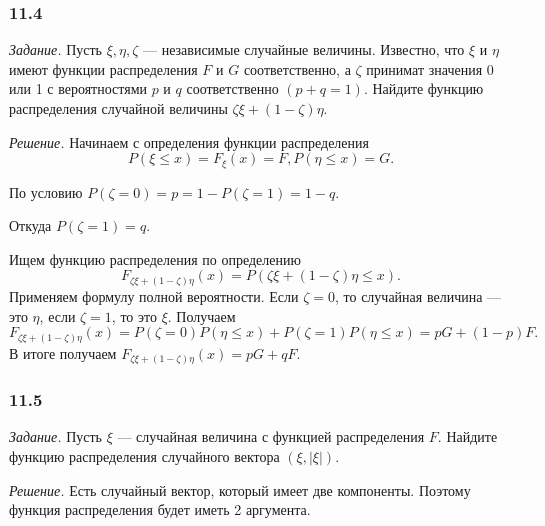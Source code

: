 \subsubsection*{11.4}

\textit{Задание.} Пусть $ \xi, \eta, \zeta $ --- независимые случайные величины.
Известно,
что $ \xi $ и $ \eta $ имеют функции распределения $F$ и $G$ соответственно,
а $ \zeta $ принимат значения 0 или 1 с вероятностями $p$ и $q$ соответственно $ \left( p + q = 1 \right) $.
Найдите функцию распределения случайной величины $ \zeta \xi + \left( 1 - \zeta \right) \eta $.

\textit{Решение.} Начинаем с определения функции распределения
$$P \left( \xi \leq x \right) = F_{ \xi } \left( x \right) = F,
P \left( \eta \leq x \right) = G.$$

По условию $P \left( \zeta = 0 \right) = p = 1 - P \left( \zeta = 1 \right) = 1 - q$.

Откуда $P \left( \zeta = 1 \right) = q$.

Ищем функцию распределения по определению
$$F_{ \zeta \xi + \left( 1 - \zeta \right) \eta } \left( x \right) =
P \left(  \zeta \xi + \left( 1 - \zeta \right) \eta \leq x \right).$$
Применяем формулу полной вероятности.
Если $ \zeta = 0$, то случайная величина --- это $ \eta $, если $ \zeta = 1$, то это $ \xi $.
Получаем
$$F_{ \zeta \xi + \left( 1 - \zeta \right) \eta } \left( x \right) =
P \left( \zeta = 0 \right) P \left( \eta \leq x \right) + P \left( \zeta = 1 \right) P \left( \eta \leq x \right) =
pG + \left( 1 - p \right) F.$$
В итоге получаем $F_{ \zeta \xi + \left( 1 - \zeta \right) \eta } \left( x \right) = pG + qF.$

\subsubsection*{11.5}

\textit{Задание.} Пусть $ \xi $ --- случайная величина с функцией распределения $F$.
Найдите функцию распределения случайного вектора $ \left( \xi, \left| \xi \right| \right) $.

\textit{Решение.} Есть случайный вектор, который имеет две компоненты.
Поэтому функция распределения будет иметь 2 аргумента.


